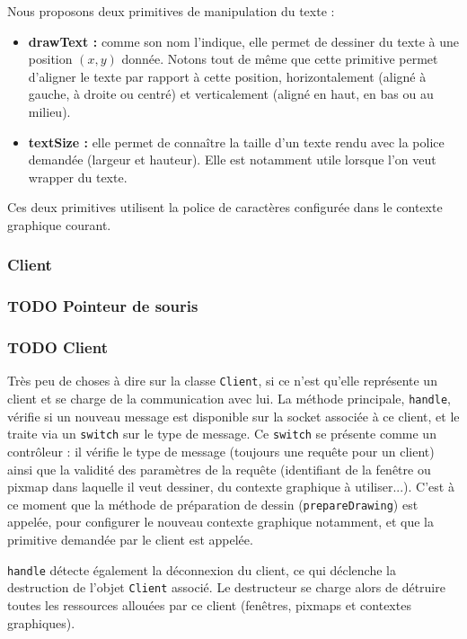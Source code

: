 Nous proposons deux primitives de manipulation du texte :
\begin{itemize}
  \item \textbf{drawText :} comme son nom l'indique, elle permet de dessiner du texte à une position $(x, y)$ donnée. Notons tout de même que cette primitive permet d'aligner le texte par rapport à cette position, horizontalement (aligné à gauche, à droite ou centré) et verticalement (aligné en haut, en bas ou au milieu).
  \item \textbf{textSize :} elle permet de connaître la taille d'un texte rendu avec la police demandée (largeur et hauteur). Elle est notamment utile lorsque l'on veut wrapper du texte.
\end{itemize}

\vspace{1em}

Ces deux primitives utilisent la police de caractères configurée dans le contexte graphique courant.

\subsubsection{Client}

\subsubsection{TODO Pointeur de souris}

\subsubsection{TODO Client}
Très peu de choses à dire sur la classe \verb|Client|, si ce n'est qu'elle représente un client et se charge de la communication avec lui. La méthode principale, \verb|handle|, vérifie si un nouveau message est disponible sur la socket associée à ce client, et le traite via un \verb|switch| sur le type de message. Ce \verb|switch| se présente comme un contrôleur : il vérifie le type de message (toujours une requête pour un client) ainsi que la validité des paramètres de la requête (identifiant de la fenêtre ou pixmap dans laquelle il veut dessiner, du contexte graphique à utiliser...). C'est à ce moment que la méthode de préparation de dessin (\verb|prepareDrawing|) est appelée, pour configurer le nouveau contexte graphique notamment, et que la primitive demandée par le client est appelée.

\verb|handle| détecte également la déconnexion du client, ce qui déclenche la destruction de l'objet \verb|Client| associé. Le destructeur se charge alors de détruire toutes les ressources allouées par ce client (fenêtres, pixmaps et contextes graphiques).

